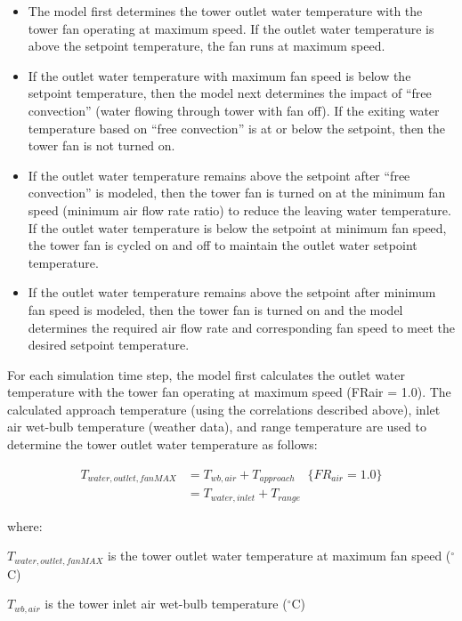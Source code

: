 \begin{itemize}
\item The model first determines the tower outlet water temperature with the tower fan operating at maximum speed. If the outlet water temperature is above the setpoint temperature, the fan runs at maximum speed.
\item If the outlet water temperature with maximum fan speed is below the setpoint temperature, then the model next determines the impact of ``free convection'' (water flowing through tower with fan off). If the exiting water temperature based on ``free convection'' is at or below the setpoint, then the tower fan is not turned on.
\item If the outlet water temperature remains above the setpoint after ``free convection'' is modeled, then the tower fan is turned on at the minimum fan speed (minimum air flow rate ratio) to reduce the leaving water temperature. If the outlet water temperature is below the setpoint at minimum fan speed, the tower fan is cycled on and off to maintain the outlet water setpoint temperature.
\item If the outlet water temperature remains above the setpoint after minimum fan speed is modeled, then the tower fan is turned on and the model determines the required air flow rate and corresponding fan speed to meet the desired setpoint temperature.
\end{itemize}

For each simulation time step, the model first calculates the outlet water temperature with the tower fan operating at maximum speed (FRair = 1.0). The calculated approach temperature (using the correlations described above), inlet air wet-bulb temperature (weather data), and range temperature are used to determine the tower outlet water temperature as follows:

\begin{equation}
  \begin{array}{rl}
    T_{water,outlet,fanMAX} &= T_{wb,air} + T_{approach} \quad \{FR_{air} = 1.0\} \\
                              &= {T_{water,inlet}} + {T_{range}}
  \end{array}
\end{equation}

where:

\({T_{water,outlet,fanMAX}}\) is the tower outlet water temperature at maximum fan speed (\(^{\circ}\)C)

\({T_{wb,air}}\) is the tower inlet air wet-bulb temperature (\(^{\circ}\)C)

